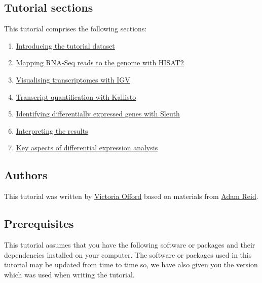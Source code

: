 \documentclass[11pt]{article}
\providecommand{\tightlist}{%
      \setlength{\itemsep}{0pt}\setlength{\parskip}{0pt}}
\begin{document}
    \hypertarget{tutorial-sections}{%
\subsection{Tutorial sections}\label{tutorial-sections}}

This tutorial comprises the following sections:

\begin{enumerate}
\def\labelenumi{\arabic{enumi}.}
\tightlist
\item
  \href{dataset-intro.ipynb}{Introducing the tutorial dataset}
\item
  \href{genome-mapping.ipynb}{Mapping RNA-Seq reads to the genome with
  HISAT2}
\item
  \href{transcriptome-visualisation.ipynb}{Visualising transcriptomes
  with IGV}
\item
  \href{transcript-quantification.ipynb}{Transcript quantification with
  Kallisto}
\item
  \href{sleuth-de.ipynb}{Identifying differentially expressed genes with
  Sleuth}
\item
  \href{de-interpretation.ipynb}{Interpreting the results}
\item
  \href{key-aspects.ipynb}{Key aspects of differential expression
  analysis}
\end{enumerate}

    \hypertarget{authors}{%
\subsection{Authors}\label{authors}}

This tutorial was written by \href{https://github.com/vaofford}{Victoria
Offord} based on materials from
\href{https://www.sanger.ac.uk/people/directory/reid-adam-james}{Adam
Reid}.

    \hypertarget{prerequisites}{%
\subsection{Prerequisites}\label{prerequisites}}

This tutorial assumes that you have the following software or packages
and their dependencies installed on your computer. The software or
packages used in this tutorial may be updated from time to time so, we
have also given you the version which was used when writing the
tutorial.
\end{document}
